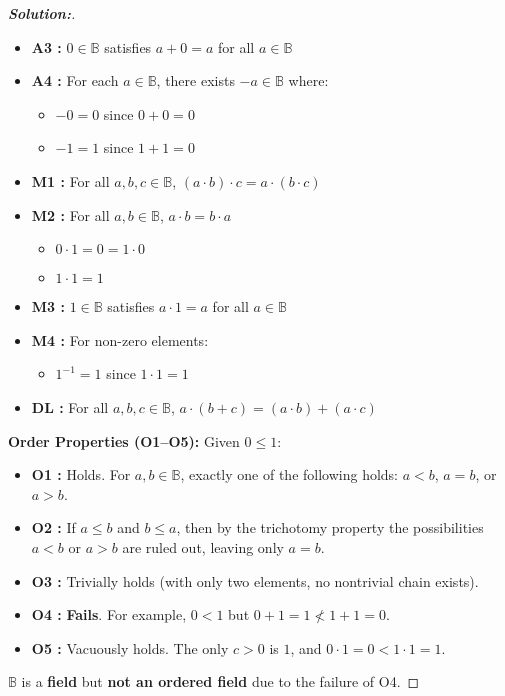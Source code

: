 \documentclass[12pt]{article}
\theoremstyle{definition}\newtheorem{problem}{Problem}
\newenvironment{solution}{\begin{proof}[\bfseries\textup{Solution:}]}{\end{proof}}
\newcommand{\B}{\mathbb{B}}
\begin{document}
\begin{solution}
\begin{itemize}
        \item \textbf{A3 :} $0 \in \B$ satisfies $a + 0 = a$ for all $a \in \B$
        \item \textbf{A4 :} For each $a \in \B$, there exists $-a \in \B$ where:
            \begin{itemize}
                \item $-0 = 0$ since $0 + 0 = 0$
                \item $-1 = 1$ since $1 + 1 = 0$
            \end{itemize}
        \item \textbf{M1 :} For all $a,b,c \in \B$, $(a \cdot b) \cdot c = a \cdot (b \cdot c)$
        \item \textbf{M2 :} For all $a,b \in \B$, $a \cdot b = b \cdot a$
            \begin{itemize}
                \item $0 \cdot 1 = 0 = 1 \cdot 0$
                \item $1 \cdot 1 = 1$
            \end{itemize}
        
        \item \textbf{M3 :} $1 \in \B$ satisfies $a \cdot 1 = a$ for all $a \in \B$
        \item \textbf{M4 :} For non-zero elements:
            \begin{itemize}
                \item $1^{-1} = 1$ since $1 \cdot 1 = 1$
            \end{itemize}
        \item \textbf{DL :} For all $a,b,c \in \B$, $a \cdot (b + c) = (a \cdot b) + (a \cdot c)$
    \end{itemize}   
            
    \textbf{Order Properties (O1–O5):}  
    Given $0 \leq 1$:
    \begin{itemize}
        \item \textbf{O1 :} Holds. For $a, b \in \mathbb{B}$, exactly one of the following holds: $a < b$, $a = b$, or $a > b$.
        \item \textbf{O2 :} If $a \le b$ and $b \le a$, then by the trichotomy property the possibilities $a < b$ or $a > b$ are ruled out, leaving only $a = b$.
        \item \textbf{O3 :} Trivially holds (with only two elements, no nontrivial chain exists).
        \item \textbf{O4 :} \textbf{Fails}. For example, $0 < 1$ but $0 + 1 = 1 \not< 1 + 1 = 0$.
        \item \textbf{O5 :} Vacuously holds. The only $c > 0$ is $1$, and $0 \cdot 1 = 0 < 1 \cdot 1 = 1$.
    \end{itemize}
            
    $\mathbb{B}$ is a \textbf{field} but \textbf{not an ordered field} due to the failure of O4.
\end{solution}
\end{document}
